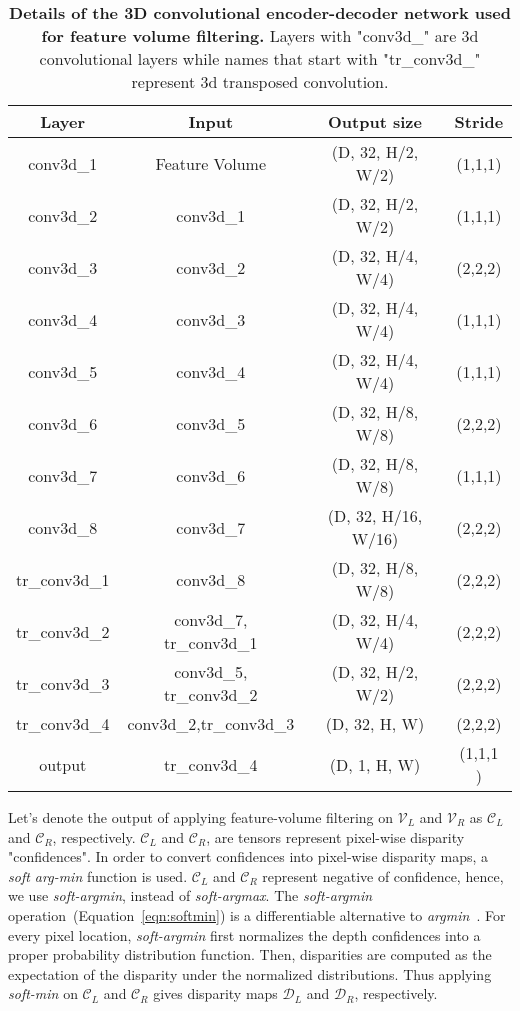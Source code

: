 \documentclass[runningheads]{llncs}
\begin{document}
\begin{table}[htb!]
\centering
\begin{tabular}{|c|c|c|c|}
\hline
Layer       & Input                  & Output size               & Stride  \\ \hline
conv3d\_1   & Feature Volume         & {(}D, 32, H/2, W/2{)}   & (1,1,1) \\ \hline
conv3d\_2   & conv3d\_1              & {(}D, 32, H/2, W/2{)}   & (1,1,1) \\ \hline
conv3d\_3   & conv3d\_2              & {(}D, 32, H/4, W/4{)}   & (2,2,2) \\ \hline
conv3d\_4   & conv3d\_3              & {(}D, 32, H/4, W/4{)}   & (1,1,1) \\ \hline
conv3d\_5   & conv3d\_4              & {(}D, 32, H/4, W/4{)}   & (1,1,1) \\ \hline
conv3d\_6   & conv3d\_5              & {(}D, 32, H/8, W/8{)}   & (2,2,2) \\ \hline
conv3d\_7   & conv3d\_6              & {(}D, 32, H/8, W/8{)}   & (1,1,1) \\ \hline
conv3d\_8   & conv3d\_7              & {(}D, 32, H/16, W/16{)} & (2,2,2) \\ \hline
tr\_conv3d\_1 & conv3d\_8              & {(}D, 32, H/8, W/8{)}   & (2,2,2) \\ \hline
tr\_conv3d\_2 & conv3d\_7, tr\_conv3d\_1 & {(}D, 32, H/4, W/4{)}   & (2,2,2) \\ \hline
tr\_conv3d\_3 & conv3d\_5, tr\_conv3d\_2 & {(}D, 32, H/2, W/2{)}   & (2,2,2) \\ \hline
tr\_conv3d\_4 & conv3d\_2,tr\_conv3d\_3  & {(}D, 32, H, W{)}         & (2,2,2) \\ \hline
output      & tr\_conv3d\_4            & {(}D, 1, H, W{)}         & (1,1,1 ) \\ \hline
\end{tabular}
\label{table:encdec}
\caption{\textbf{Details of the 3D convolutional encoder-decoder network used for feature volume filtering.} Layers with "conv3d\_" are 3d convolutional layers while names that start with "tr\_conv3d\_" represent 3d transposed convolution.}
\end{table}

Let's denote the output of applying feature-volume filtering on $\mathcal{V}_{L}$ and $\mathcal{V}_{R}$ as $\mathcal{C}_{L}$ and $\mathcal{C}_{R}$, respectively. $\mathcal{C}_{L}$ and $\mathcal{C}_{R}$, are tensors represent pixel-wise disparity "confidences". In order to convert confidences into pixel-wise disparity maps, a \textit{soft arg-min} function is used. $\mathcal{C}_{L}$ and $\mathcal{C}_{R}$ represent negative of confidence, hence, we use \textit{soft-argmin}, instead of \textit{soft-argmax}. The \textit{soft-argmin} operation~(Equation~\ref{eqn:softmin}) is a differentiable alternative to \textit{argmin}~\cite{gcnet}. For every pixel location, \textit{soft-argmin} first normalizes the depth confidences into a proper probability distribution function. Then, disparities are computed as the expectation of the disparity under the normalized distributions. Thus applying \textit{soft-min} on $\mathcal{C}_{L}$ and $\mathcal{C}_{R}$ gives disparity maps $\mathcal{D}_{L}$ and $\mathcal{D}_{R}$, respectively.
\end{document}
